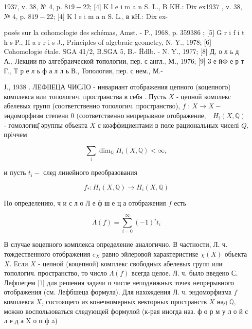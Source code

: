 \documentclass[10pt]{article}
\begin{document}
1937, v. 38, № 4, p. $819-22$; [4] K l e i m a n S. L., B KH.: Dix ex1937 , v. 38, № 4, p. $819-22$; [4] K l e i m a n S. L., в кH.: Dix ex-

posés sur la cohomologie des schémas, Amst. - P., 1968, p. 359386 ; [5] G r i f i t h s P., H a r r i s J., Principles of algebraic geometry, N. Y., 1978; [6] Cohomologie étale. SGA 41/2, B.SGA 5, B.- Ḧdlb. - N. Y., 1977; [8] Д, о л ь д А., Лекции по алгебраической топологии, пер. с англ., М., 1976; [9] 3 е йФ е р т Г., Т р е л ь ф а л л ь В., Топология, пер. с нем., М.-

Ј., 1938 . ЛЕФІІЕЦА ЧИСЛО - инвариант отображения цепного (коцепного) комплекса или топологич. пространства в себя . Пусть $X$ - цепной комплекс абелевых групп (соответственно топологич. пространство), $f$ : $X \rightarrow X-$ эндоморфизм степени 0 (соответственно непрерывное отображение,$\quad H_{i}(X, \mathbb{Q})$ - гомологиц̆ әруппы объекта $X$ с коәффициентами в поле рациональных чиселі $Q$, пріччем



\[

\sum_{i} \operatorname{dim}_{\mathbb{Q}} H_{i}(X, \mathbb{Q})<\infty,

\]



и пусть $t_{i}-$ след линейного преобразования



\[

f_{*}: H_{i}(X, \mathbb{Q}) \rightarrow H_{i}(X, \mathbb{Q})

\]



По определению, ч и с л о Л е ф ш е ц а отображения $f$ есть



\[

\Lambda(f)=\sum_{i=0}^{\infty}(-1)^{i} t_{i}

\]



В случае коцепного комплекса определение аналогично. В частности, Л. ч. тождественного отображения $e_{X}$ равно эйлеровой характеристике $\chi(X)$ обьекта $X$. Если $X$ - цепной (коцепной) комплекс свободных абелевых групп или топологич. пространство, то число $\Lambda(f)$ всегда целое. Л. ч. было введено С. Лефшецем [1] для решения задачи о числе неподвижных точек непрерывного отображения (см. Лефбшеца формула). Для нахождения Л. ч. эндоморфизма $f$ комплекса $X$, состоящего из конечномерных векторных пространств $X$ над $\mathbb{Q}$, можно воспользоваться следующей формулой (к-рая иногда наз. ф о р м у л о й с л е д а $\mathrm{X}$ о п $ф$ a)
\end{document}
